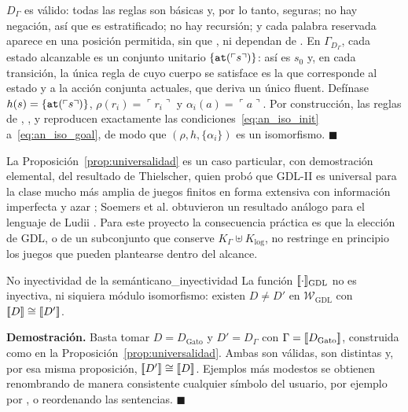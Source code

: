 $D_\Gamma$ es válido: todas las reglas son básicas y, por lo tanto, seguras; no hay negación, así que es estratificado; no hay recursión; y cada palabra reservada aparece en una posición permitida, sin que ,  ni  dependan de . En $\Gamma_{D_\Gamma}$, cada estado alcanzable es un conjunto unitario $\{\texttt{at}(\ulcorner s \urcorner)\}$: así es $s_0$ y, en cada transición, la única regla de  cuyo cuerpo se satisface es la que corresponde al estado y a la acción conjunta actuales, que deriva un único fluent. Defínase $h(s) = \{\texttt{at}(\ulcorner s \urcorner)\}$, $\rho(r_i) = \ulcorner r_i \urcorner$ y $\alpha_i(a) = \ulcorner a \urcorner$. Por construcción, las reglas de , ,  y  reproducen exactamente las condiciones~\eqref{eq:an_iso_init} a~\eqref{eq:an_iso_goal}, de modo que $(\rho, h, \{\alpha_i\})$ es un isomorfismo. \hfill $\blacksquare$

La Proposición~\ref{prop:universalidad} es un caso particular, con demostración elemental, del resultado de Thielscher, quien probó que GDL-II es universal para la clase mucho más amplia de juegos finitos en forma extensiva con información imperfecta y azar \cite{Thielscher2011Universal}; Soemers et al. obtuvieron un resultado análogo para el lenguaje de Ludii \cite{Soemers2024Ludii}. Para este proyecto la consecuencia práctica es que la elección de GDL, o de un subconjunto que conserve $K_\Gamma \uplus K_{\mathrm{log}}$, no restringe en principio los juegos que pueden plantearse dentro del alcance.

\begin{proposicion}{No inyectividad de la semántica}{no_inyectividad}
La función $[\![\cdot]\!]_{\mathrm{GDL}}$ no es inyectiva, ni siquiera módulo isomorfismo: existen $D \neq D'$ en $\mathcal W_{\mathrm{GDL}}$ con $[\![D]\!] \cong [\![D']\!]$.
\end{proposicion}

\noindent\textbf{Demostración.} Basta tomar $D = D_{\text{Gato}}$ y $D' = D_{\Gamma}$ con $\Gamma = [\![D_{\text{Gato}}]\!]$, construida como en la Proposición~\ref{prop:universalidad}. Ambas son válidas, son distintas y, por esa misma proposición, $[\![D']\!] \cong [\![D]\!]$. Ejemplos más modestos se obtienen renombrando de manera consistente cualquier símbolo del usuario, por ejemplo  por , o reordenando las sentencias. \hfill $\blacksquare$

